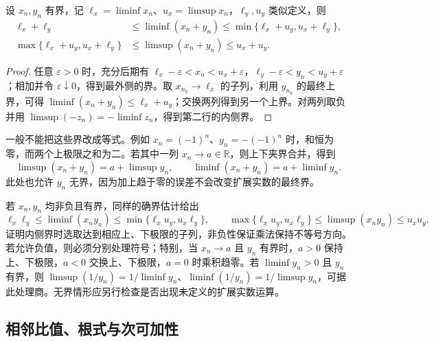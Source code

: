 \begin{proposition}
\label{prop:pei-limsup-sum}
设 $x_n,y_n$ 有界，记 $\ell_x=\liminf x_n$、$u_x=\limsup x_n$，$\ell_y,u_y$ 类似定义，则
\begin{equation}
    \begin{aligned}
        \ell_x+\ell_y&\le\liminf(x_n+y_n)
          \le\min\{\ell_x+u_y,u_x+\ell_y\},\\
        \max\{\ell_x+u_y,u_x+\ell_y\}
          &\le\limsup(x_n+y_n)\le u_x+u_y.
    \end{aligned}
    \label{eq:pei-limsup-sum-bounds}
\end{equation}
\end{proposition}
\begin{proof}
任意 $\varepsilon>0$ 时，充分后期有 $\ell_x-\varepsilon<x_n<u_x+\varepsilon$，$\ell_y-\varepsilon<y_n<u_y+\varepsilon$；相加并令 $\varepsilon\downarrow0$，得到最外侧的界。取 $x_{n_k}\to\ell_x$ 的子列，利用 $y_{n_k}$ 的最终上界，可得 $\liminf(x_n+y_n)\le\ell_x+u_y$；交换两列得到另一个上界。对两列取负并用 $\limsup(-z_n)=-\liminf z_n$，得到第二行的内侧界。
\end{proof}

一般不能把这些界改成等式。例如 $x_n=(-1)^n$、$y_n=-(-1)^n$ 时，和恒为零，而两个上极限之和为二。若其中一列 $x_n\to a\in\mathbb{R}$，则上下夹界合并，得到
\[
    \limsup(x_n+y_n)=a+\limsup y_n,\qquad
    \liminf(x_n+y_n)=a+\liminf y_n.
\]
此处也允许 $y_n$ 无界，因为加上趋于零的误差不会改变扩展实数的最终界。

若 $x_n,y_n$ 均非负且有界，同样的确界估计给出
\[
    \ell_x\ell_y\le\liminf(x_ny_n)
      \le\min\{\ell_xu_y,u_x\ell_y\},\qquad
    \max\{\ell_xu_y,u_x\ell_y\}
      \le\limsup(x_ny_n)\le u_xu_y.
\]
证明内侧界时选取达到相应上、下极限的子列，非负性保证乘法保持不等号方向。若允许负值，则必须分别处理符号；特别，当 $x_n\to a$ 且 $y_n$ 有界时，$a>0$ 保持上、下极限，$a<0$ 交换上、下极限，$a=0$ 时乘积趋零。若 $\liminf y_n>0$ 且 $y_n$ 有界，则 $\limsup(1/y_n)=1/\liminf y_n$、$\liminf(1/y_n)=1/\limsup y_n$，可据此处理商。无界情形应另行检查是否出现未定义的扩展实数运算。

\subsection{相邻比值、根式与次可加性}


